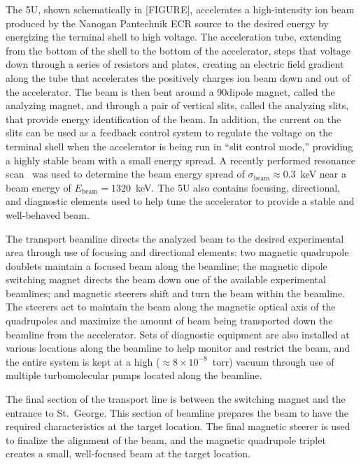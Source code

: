 The 5U, shown schematically in [FIGURE], accelerates a high-intensity
ion beam produced by the Nanogan Pantechnik ECR source to the desired
energy by energizing the terminal shell to high voltage. The
acceleration tube, extending from the bottom of the shell to the bottom
of the accelerator, steps that voltage down through a series of
resistors and plates, creating an electric field gradient along the tube
that accelerates the positively charges ion beam down and out of the
accelerator. The beam is then bent around a 90\degree dipole magnet,
called the analyzing magnet, and through a pair of vertical slits,
called the analyzing slits, that provide energy identification of the
beam. In addition, the current on the slits can be used as a feedback
control system to regulate the voltage on the terminal shell when the
accelerator is being run in ``slit control mode,'' providing a highly
stable beam with a small energy spread. A recently performed
 resonance
scan~\cite{Gilardy2017} was used to determine the beam energy spread of
$\sigma_{\textrm{beam}} \approx 0.3$~keV near a beam energy of
$E_{\textrm{beam}} = 1320$~keV. The 5U also contains focusing,
directional, and diagnostic elements used to help tune the accelerator
to provide a stable and well-behaved beam.

The transport beamline directs the analyzed beam to the desired
experimental area through use of focusing and directional elements: two
magnetic quadrupole doublets maintain a focused beam along the beamline;
the magnetic dipole switching magnet directs the beam down one of the
available experimental beamlines; and magnetic steerers shift and turn
the beam within the beamline. The steerers act to maintain the beam
along the magnetic optical axis of the quadrupoles and maximize the
amount of beam being transported down the beamline from the accelerator.
Sets of diagnostic equipment are also installed at various locations
along the beamline to help monitor and restrict the beam, and the entire
system is kept at a high ($\approx 8\times 10^{-8}$~torr) vacuum through
use of multiple turbomolecular pumps located along the beamline.

The final section of the transport line is between the switching magnet
and the entrance to St.\ George. This section of beamline prepares the
beam to have the required characteristics at the target location. The
final magnetic steerer is used to finalize the alignment of the beam,
and the magnetic quadrupole triplet creates a small, well-focused beam
at the target location.


